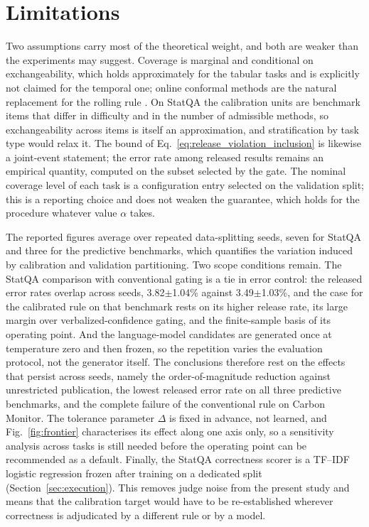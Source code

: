 \documentclass[preprint,12pt,authoryear]{elsarticle}
\begin{document}
\section{Limitations}
\label{sec:results_limitations}

Two assumptions carry most of the theoretical weight, and both are weaker than the experiments may suggest.
Coverage is marginal and conditional on exchangeability, which holds approximately for the tabular tasks and is explicitly not claimed for the temporal one; online conformal methods are the natural replacement for the rolling rule \citep{angelopoulos2024online}.
On StatQA the calibration units are benchmark items that differ in difficulty and in the number of admissible methods, so exchangeability across items is itself an approximation, and stratification by task type would relax it.
The bound of Eq.~\eqref{eq:release_violation_inclusion} is likewise a joint-event statement; the error rate among released results remains an empirical quantity, computed on the subset selected by the gate.
The nominal coverage level of each task is a configuration entry selected on the validation split; this is a reporting choice and does not weaken the guarantee, which holds for the procedure whatever value $\alpha$ takes.

The reported figures average over repeated data-splitting seeds, seven for StatQA and three for the predictive benchmarks, which quantifies the variation induced by calibration and validation partitioning.
Two scope conditions remain.
The StatQA comparison with conventional gating is a tie in error control: the released error rates overlap across seeds, 3.82$\pm$1.04\% against 3.49$\pm$1.03\%, and the case for the calibrated rule on that benchmark rests on its higher release rate, its large margin over verbalized-confidence gating, and the finite-sample basis of its operating point.
And the language-model candidates are generated once at temperature zero and then frozen, so the repetition varies the evaluation protocol, not the generator itself.
The conclusions therefore rest on the effects that persist across seeds, namely the order-of-magnitude reduction against unrestricted publication, the lowest released error rate on all three predictive benchmarks, and the complete failure of the conventional rule on Carbon Monitor.
The tolerance parameter $\Delta$ is fixed in advance, not learned, and Fig.~\ref{fig:frontier} characterises its effect along one axis only, so a sensitivity analysis across tasks is still needed before the operating point can be recommended as a default.
Finally, the StatQA correctness scorer is a TF--IDF logistic regression frozen after training on a dedicated split (Section~\ref{sec:execution}).
This removes judge noise from the present study and means that the calibration target would have to be re-established wherever correctness is adjudicated by a different rule or by a model.
\end{document}
